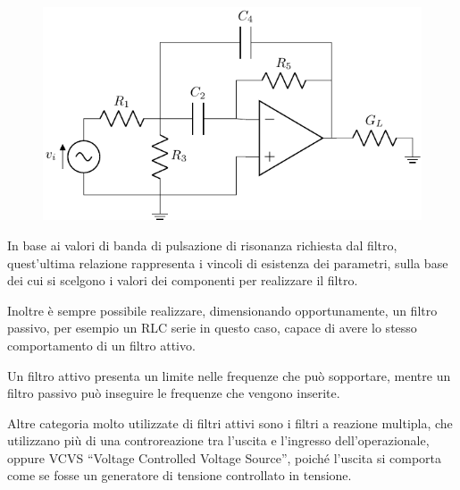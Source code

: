 \documentclass{article}
\numberwithin{equation}{subsection}
\begin{document}
\begin{figure}[H]%
    \centering
    \includegraphics{filtro-attivo-2.pdf}%
\end{figure}    
In base ai valori di banda di pulsazione di risonanza richiesta dal filtro, quest'ultima relazione rappresenta i vincoli di esistenza dei parametri, sulla 
base dei cui si scelgono i valori dei componenti per realizzare il filtro. 

Inoltre è sempre possibile realizzare, dimensionando opportunamente, un filtro passivo, per esempio un RLC serie in questo caso, capace di avere lo 
stesso comportamento di un filtro attivo. 

Un filtro attivo presenta un limite nelle frequenze che può sopportare, mentre un filtro passivo può inseguire le frequenze che vengono inserite. 


Altre categoria molto utilizzate di filtri attivi sono i filtri a reazione multipla, che utilizzano più di una controreazione tra l'uscita e l'ingresso 
dell'operazionale, oppure VCVS ``Voltage Controlled Voltage Source'', poiché l'uscita si comporta come se fosse un generatore di tensione controllato 
in tensione. 

\clearpage
\end{document}
